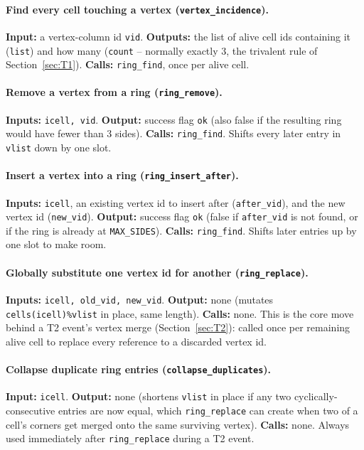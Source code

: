 \documentclass[11pt,a4paper]{report}
\begin{document}
\paragraph{Find every cell touching a vertex (\texttt{vertex\_incidence}).}
\textbf{Input:} a vertex-column id \texttt{vid}. \textbf{Outputs:} the
list of alive cell ids containing it (\texttt{list}) and how many
(\texttt{count} -- normally exactly 3, the trivalent rule of
Section~\ref{sec:T1}). \textbf{Calls:} \texttt{ring\_find}, once per
alive cell.
\paragraph{Remove a vertex from a ring (\texttt{ring\_remove}).}
\textbf{Inputs:} \texttt{icell, vid}. \textbf{Output:} success flag
\texttt{ok} (also false if the resulting ring would have fewer than 3
sides). \textbf{Calls:} \texttt{ring\_find}. Shifts every later entry
in \texttt{vlist} down by one slot.
\paragraph{Insert a vertex into a ring (\texttt{ring\_insert\_after}).}
\textbf{Inputs:} \texttt{icell}, an existing vertex id to insert after
(\texttt{after\_vid}), and the new vertex id (\texttt{new\_vid}).
\textbf{Output:} success flag \texttt{ok} (false if \texttt{after\_vid}
is not found, or if the ring is already at \texttt{MAX\_SIDES}).
\textbf{Calls:} \texttt{ring\_find}. Shifts later entries up by one
slot to make room.
\paragraph{Globally substitute one vertex id for another
(\texttt{ring\_replace}).} \textbf{Inputs:} \texttt{icell, old\_vid,
new\_vid}. \textbf{Output:} none (mutates \texttt{cells(icell)\%vlist}
in place, same length). \textbf{Calls:} none. This is the core move
behind a T2 event's vertex merge (Section~\ref{sec:T2}): called once
per remaining alive cell to replace every reference to a discarded
vertex id.
\paragraph{Collapse duplicate ring entries (\texttt{collapse\_duplicates}).}
\textbf{Input:} \texttt{icell}. \textbf{Output:} none (shortens
\texttt{vlist} in place if any two cyclically-consecutive entries are
now equal, which \texttt{ring\_replace} can create when two of a
cell's corners get merged onto the same surviving vertex). \textbf{Calls:}
none. Always used immediately after \texttt{ring\_replace} during a T2
event.
\end{document}
